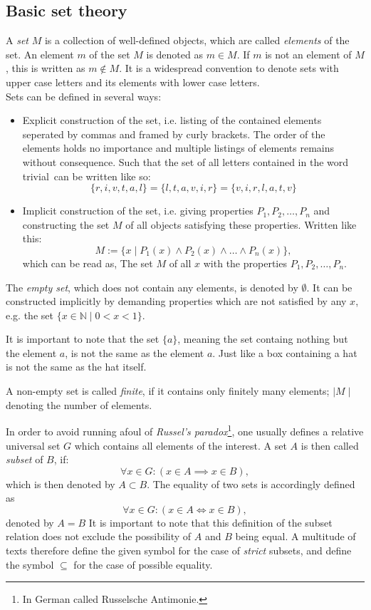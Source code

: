 \documentclass[12pt]{article}
\begin{document}
\subsection{Basic set theory}
A \textit{set} $M$ is a collection of well-defined objects, which are called \textit{elements} of the set. An element $m$ of the set $M$ is denoted as $m \in M$. If $m$ is not an element of $M$, this is written as $m \notin M$. It is a widespread convention to denote sets with upper case letters and its elements with lower case letters. \\
Sets can be defined in several ways:
\begin{itemize}
\item Explicit construction of the set, i.e. listing of the contained elements seperated by commas and framed by curly brackets. The order of the elements holds no importance and multiple listings of elements remains without consequence. Such that the set of all letters contained in the word \glqq trivial\grqq \ can be written like so:
\[
\{ r, i, v, t, a, l\} = \{ l, t, a, v, i, r\} = \{ v, i, r, l, a , t, v\}
\]
\item  Implicit construction of the set, i.e. giving properties $P_1, P_2, \dots , P_n$ and constructing the set $M$ of all objects satisfying these properties. Written like this:
\[
M:= \{ x \mid P_1(x) \land P_2(x)\land \dots \land P_n(x)\},
\]
which can be read as, \glqq The set $M$ of all $x$ with the properties $P_1, P_2, \dots , P_n$\grqq .
\end{itemize}
The \textit{empty set}, which does not contain any elements, is denoted by $\emptyset$. It can be constructed implicitly by demanding properties which are not satisfied by any $x$, e.g. the set $\{ x \in \mathbb{N} \mid 0 < x < 1\}$.

It is important to note that the set $\{ a\}$, meaning the set containg nothing but the element $a$, is not the same as the element $a$. Just like a box containing a hat is not the same as the hat itself.

A non-empty set is called \textit{finite}, if it contains only finitely many elements; $\mid M\mid$ denoting the number of elements.

In order to avoid running afoul of \textit{Russel's paradox}\footnote{In German called \glqq Russelsche Antimonie\grqq.}, one usually defines a relative universal set $G$ which contains all elements of the interest. A set  $A$ is then called \textit{subset} of $B$, if:
\[
\forall x \in G : (x \in A \implies x \in B),
\]
which is then denoted by $A \subset B$.
The equality of two sets is accordingly defined as 
\[
\forall x \in G : (x \in A \iff x \in B),
\]
denoted by $A = B$
It is important to note that this definition of the subset relation does not exclude the possibility of $A$ and $B$ being equal. A multitude of texts therefore define the given symbol for the case of \textit{strict} subsets, and define the symbol $\subseteq$ for the case of possible equality. 
\end{document}

